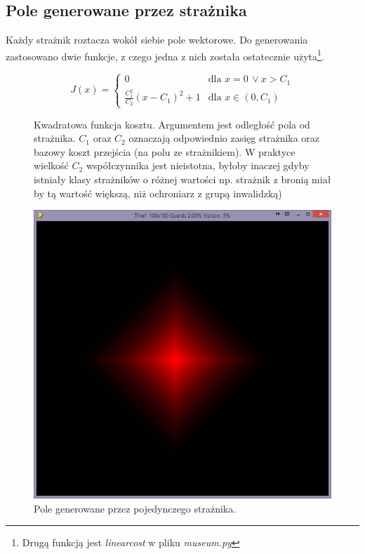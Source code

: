 \documentclass[12pt]{article}
\begin{document}
\subsection{Pole generowane przez strażnika}
Każdy strażnik roztacza wokół siebie pole wektorowe. Do generowania zastosowano dwie funkcje, z czego jedna z nich została ostatecznie użyta\footnote{ Drugą funkcją jest \emph{linear\textunderscore cost} w pliku \emph{museum.py}}.

\begin{figure}[!ht, caption=xd]
\centering
\[
 J(x) =
  \begin{cases}
   0 & \text{dla } x = 0\, \vee x > C_1\\
   \frac{C_1^2}{C_2} (x-C_1)^2 + 1       &  \text{dla } x \in (0, C_1)  
  \end{cases}
\]
\caption*{Kwadratowa funkcja kosztu. Argumentem jest odległość pola od strażnika. $C_1$ oraz $C_2$ oznaczają odpowiednio zasięg strażnika oraz bazowy koszt przejścia (na polu ze strażnikiem). W praktyce wielkość $C_2$ współczynnika jest nieistotna, byłoby inaczej gdyby istniały klasy strażników o różnej wartości np. strażnik z bronią miał by tą wartość większą, niż ochroniarz z grupą inwalidzką)}
\end{figure}

\begin{figure}[h]
\centering
\includegraphics[scale=0.25,keepaspectratio=true]{Clipboard02.png} 
\caption{Pole generowane przez pojedynczego strażnika.}
\end{figure}
\end{document}
